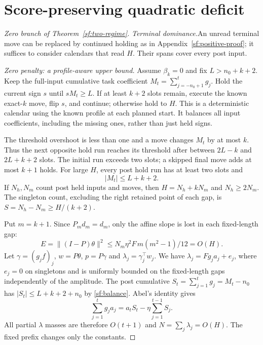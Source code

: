 \documentclass[journal]{IEEEtran}
\begin{document}
\section{Score-preserving quadratic deficit}\label{sf:zero-proof}
\begin{proof}[Zero branch of Theorem~\ref{sf:two-regime}]\leavevmode
\par\smallskip\noindent\textit{Terminal dominance.}\enspace  An unread terminal move can be replaced
by continued holding as in Appendix~\ref{sf:positive-proof}; it suffices to
consider calendars that read $H$. Their spans cover every post input.

\par\smallskip\noindent\textit{Zero penalty: a profile-aware upper bound.}\enspace 
Assume $\beta_k=0$ and fix $L>n_0+k+2$.
Keep the full-input cumulative task coefficient
$M_t=\sum_{j=-n_0+1}^t g_j$.
Hold the current sign $s$ until $sM_t\ge L$.
If at least $k+2$ slots remain, execute the known exact-$k$ move,
flip $s$, and continue; otherwise hold to $H$.
This is a deterministic calendar using the known profile at each
planned start. It balances all input coefficients, including the
missing ones, rather than just held signs.

The threshold overshoot is less than one and a move changes $M_t$
by at most $k$. Thus the next opposite hold run reaches its threshold
after between $2L-k$ and $2L+k+2$ slots.
The initial run exceeds two slots; a skipped final move adds at most
$k+1$ holds. For large $H$, every post hold run has at least two
slots and
\begin{equation}\label{sf:balance}
|M_t|\le L+k+2 .
\end{equation}
If $N_h,N_m$ count post held inputs and moves, then
$H=N_h+kN_m$ and $N_h\ge2N_m$.
The singleton count, excluding the right retained point of each gap,
is $S=N_h-N_m\ge H/(k+2)$.

Put $m=k+1$. Since $P_md_m=d_m$, only the affine slope is lost
in each fixed-length gap:
\begin{equation}\label{sf:slope-loss}
E=\|(I-P)\theta\|^2\le
N_m\eta^2F\,m(m^2-1)/12=O(H).
\end{equation}
Let $\gamma=(g_jf)_j$, $w=P\theta$, $p=P\gamma$ and
$\lambda_j=\gamma_j^\top w_j$.
We have $\lambda_j=Fg_ja_j+e_j$, where $e_j=0$ on singletons
and is uniformly bounded on the fixed-length gaps independently
of the amplitude. The post cumulative $S_t=\sum_{j=1}^tg_j=M_t-n_0$
has $|S_t|\le L+k+2+n_0$ by \eqref{sf:balance}. Abel's identity gives
\[
\sum_{j=1}^t g_ja_j=a_tS_t-\eta\sum_{j=1}^{t-1}S_j .
\]
All partial $\lambda$ masses are therefore $O(t+1)$ and
$N=\sum_j\lambda_j=O(H)$. The fixed prefix changes only the constants.


\end{proof}
\end{document}
